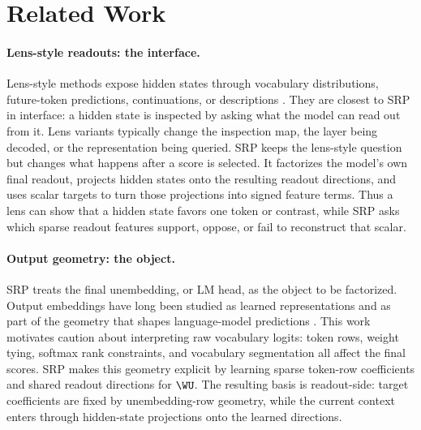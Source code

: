 \section{Related Work}

\paragraph{Lens-style readouts: the interface.}
Lens-style methods expose hidden states through vocabulary distributions,
future-token predictions, continuations, or descriptions
\citep{nostalgebraist2020,belrose2023tuned,pal2023future,ghandeharioun2024patchscopes}.
They are closest to SRP in interface: a hidden state is inspected by asking what
the model can read out from it. Lens variants typically change the inspection
map, the layer being decoded, or the representation being queried. SRP keeps the
lens-style question but changes what happens after a score is selected. It
factorizes the model's own final readout, projects hidden states onto the
resulting readout directions, and uses scalar targets to turn those projections
into signed feature terms. Thus a lens can show that a hidden state favors one
token or contrast, while SRP asks which sparse readout features support, oppose,
or fail to reconstruct that scalar.

\paragraph{Output geometry: the object.}
SRP treats the final unembedding, or LM head, as the object to be factorized.
Output embeddings have long been studied as learned representations and as part
of the geometry that shapes language-model predictions
\citep{press2017outputembedding,inan2017tying,yang2018softmaxbottleneck,bostrom2020bpe}.
This work motivates caution about interpreting raw vocabulary logits: token
rows, weight tying, softmax rank constraints, and vocabulary segmentation all
affect the final scores. SRP makes this geometry explicit by learning sparse
token-row coefficients and shared readout directions for \(\WU\). The resulting
basis is readout-side: target coefficients are fixed by unembedding-row
geometry, while the current context enters through hidden-state projections onto
the learned directions.

